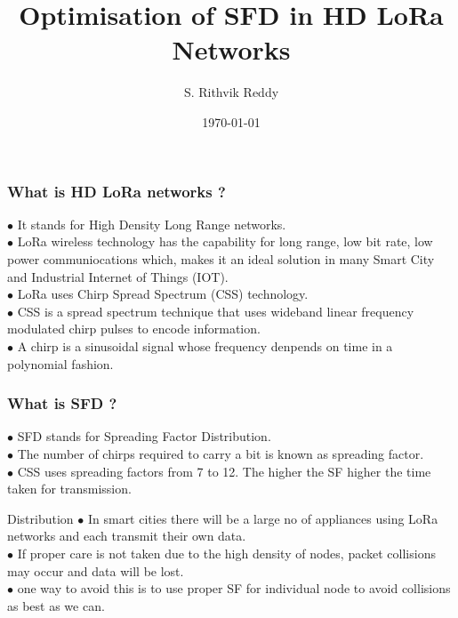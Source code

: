 \documentclass{beamer}
\title{Optimisation of SFD  in HD LoRa Networks}
\author{S. Rithvik Reddy}
\institute{IIT H (CSE)}
\date{\today}
\begin{document}
\begin{frame}
\titlepage
\end{frame}

\begin{frame}
\frametitle{What is HD LoRa networks ?}

$\bullet$ It stands for High Density Long Range networks.\\
$\bullet$ LoRa wireless technology has the capability for long range, low bit rate, low power communiocations which, makes it an ideal solution in many Smart City and Industrial Internet of Things (IOT).\\
$\bullet$ LoRa uses Chirp Spread Spectrum (CSS) technology.\\
$\bullet$ CSS is a spread spectrum technique that uses wideband linear frequency modulated chirp pulses to encode information.\\
$\bullet$ A chirp is a sinusoidal signal whose frequency denpends on time in a polynomial fashion. 

\end{frame}


\begin{frame}
\frametitle{What is SFD ?}

$\bullet$ SFD stands for Spreading Factor Distribution.\\
$\bullet$ The number of chirps required to carry a bit is known as spreading factor.\\
$\bullet$ CSS uses spreading factors from 7 to 12. The higher the SF higher the time taken for transmission.
\begin{block}{Distribution}
$\bullet$ In smart cities there will be a large no of appliances using LoRa networks and each transmit their own data.\\
$\bullet$ If proper care is not taken due to the high density of nodes, packet collisions may occur and data will be lost.\\
$\bullet$ one way to avoid this is to use proper SF for individual node to avoid collisions as best as we can.
\end{block}

\end{frame}
\end{document}
